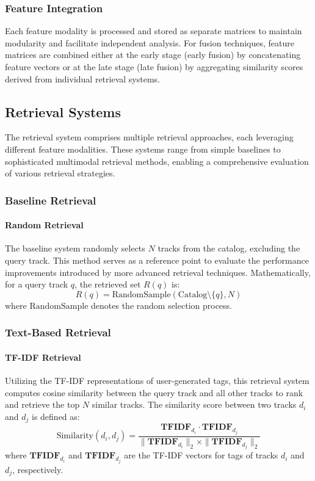 \documentclass[sigconf]{acmart}
\begin{document}
\subsubsection{Feature Integration}

Each feature modality is processed and stored as separate matrices to maintain modularity and facilitate independent analysis. For fusion techniques, feature matrices are combined either at the early stage (early fusion) by concatenating feature vectors or at the late stage (late fusion) by aggregating similarity scores derived from individual retrieval systems.

\subsection{Retrieval Systems}
\label{subsec:retrieval_systems}

The retrieval system comprises multiple retrieval approaches, each leveraging different feature modalities. These systems range from simple baselines to sophisticated multimodal retrieval methods, enabling a comprehensive evaluation of various retrieval strategies.

\subsubsection{Baseline Retrieval}

\paragraph{Random Retrieval}
The baseline system randomly selects \( N \) tracks from the catalog, excluding the query track. This method serves as a reference point to evaluate the performance improvements introduced by more advanced retrieval techniques. Mathematically, for a query track \( q \), the retrieved set \( R(q) \) is:
\[
R(q) = \text{RandomSample}(\text{Catalog} \setminus \{q\}, N)
\]
where \( \text{RandomSample} \) denotes the random selection process.

\subsubsection{Text-Based Retrieval}

\paragraph{TF-IDF Retrieval}
Utilizing the TF-IDF representations of user-generated tags, this retrieval system computes cosine similarity between the query track and all other tracks to rank and retrieve the top \( N \) similar tracks. The similarity score between two tracks \( d_i \) and \( d_j \) is defined as:
\[
\text{Similarity}(d_i, d_j) = \frac{\mathbf{TFIDF}_{d_i} \cdot \mathbf{TFIDF}_{d_j}}{\|\mathbf{TFIDF}_{d_i}\|_2 \times \|\mathbf{TFIDF}_{d_j}\|_2}
\]
where \( \mathbf{TFIDF}_{d_i} \) and \( \mathbf{TFIDF}_{d_j} \) are the TF-IDF vectors for tags of tracks \( d_i \) and \( d_j \), respectively.
\end{document}
